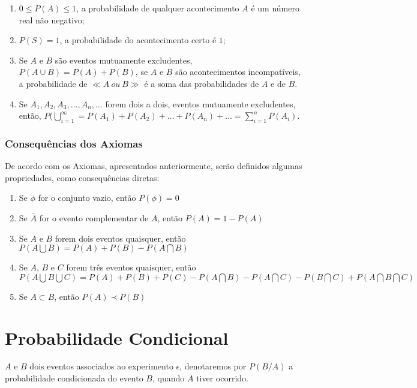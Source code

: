 \begin{enumerate}
    \item $0\leqslant P(A) \leqslant 1$, a probabilidade de qualquer acontecimento $A$ é um número real não negativo;
    \item $P(S)=1$, a probabilidade do acontecimento certo é $1$;
    \item Se $A$ e $B$ são eventos mutuamente excludentes, $P(A \cup B)=P(A)+P(B)$, se $A$ e $B$ são acontecimentos incompatíveis, a probabilidade de $\ll A \ ou \ B \gg$ é a soma das probabilidades de $A$ e de $B$.
    \item Se $A_{1},A_{2},A_{3}, \ldots, A_{n}, \ldots$ forem dois a dois, eventos mutuamente excludentes, então, $P(\bigcup_{i=1}^{\infty}= P(A_{1})+P(A_{2})+ \ldots + P(A_{n})+\ldots = \sum_{i=1}^{n} P(A_{i})$.
\end{enumerate}




\subsubsection{Consequências dos Axiomas}

\inic De acordo com os Axiomas, apresentados anteriormente, serão definidos algumas propriedades, como consequências diretas:

\begin{enumerate}
\item Se $\phi$ for o conjunto vazio, então $P(\phi)=0$
\item Se $\bar{A}$ for o evento complementar de $A$, então $P(A)=1-P(A)$
\item Se $A$ e $B$ forem dois eventos quaisquer, então $P(A \bigcup B)= P(A)+P(B)-P(A \bigcap B)$ 
\item Se $A$, $B$ e $C$ forem três eventos quaisquer, então $P(A \bigcup B \bigcup C)= P(A)+P(B)+P(C)- P(A \bigcap B)- P(A \bigcap C)- P(B \bigcap C)+P(A \bigcap B \bigcap C)$
\item Se $A \subset B$, então $P(A) \prec P(B)$
\end{enumerate}


\section{Probabilidade Condicional}

\inicSeja $A$ e $B$ dois eventos associados ao experimento $\epsilon$, denotaremos por $P(B/A)$ a probabilidade condicionada do evento $B$, quando $A$ tiver ocorrido.\vskip0.3cm

